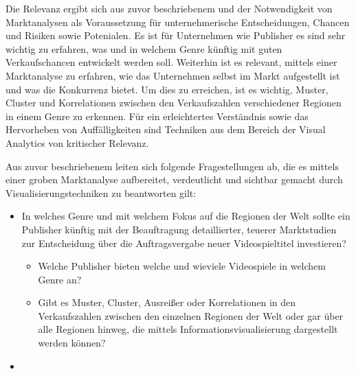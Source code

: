 \documentclass[usegeometry=true]{scrartcl}
\begin{document}
Die Relevanz ergibt sich aus zuvor beschriebenem und der Notwendigkeit von Marktanalysen als Voraussetzung für unternehmerische Entscheidungen, Chancen und Risiken sowie Potenialen.\cite{Fleig.2020}
Es ist für Unternehmen wie Publisher es sind sehr wichtig zu erfahren, was und in welchem Genre künftig mit guten Verkaufschancen entwickelt werden soll.
Weiterhin ist es relevant, mittels einer Marktanalyse zu erfahren, wie das Unternehmen selbst im Markt aufgestellt ist und was die Konkurrenz bietet. 
Um dies zu erreichen, ist es wichtig, Muster, Cluster und Korrelationen zwischen den Verkaufszahlen verschiedener Regionen in einem Genre zu erkennen. 
Für ein erleichtertes Verständnis sowie das Hervorheben von Auffälligkeiten sind Techniken aus dem Bereich der Visual Analytics von kritischer Relevanz.

Aus zuvor beschriebenem leiten sich folgende Fragestellungen ab, die es mittels einer groben Marktanalyse aufbereitet, verdeutlicht und sichtbar gemacht durch Visualisierungstechniken zu beantworten gilt:
\begin{itemize}
    \item In welches Genre und mit welchem Fokus auf die Regionen der Welt sollte ein Publisher künftig mit der Beauftragung detaillierter, teuerer Marktstudien zur Entscheidung über die Auftragsvergabe neuer Videospieltitel investieren?
    \begin{itemize}
        \item Welche Publisher bieten welche und wieviele Videospiele in welchem Genre an?
        \item Gibt es Muster, Cluster, Ausreißer oder Korrelationen in den Verkaufszahlen zwischen den einzelnen Regionen der Welt oder gar über alle Regionen hinweg, die mittels Informationsvisualisierung dargestellt werden können?
    \end{itemize}
    \item 
\end{itemize}

\end{document}
